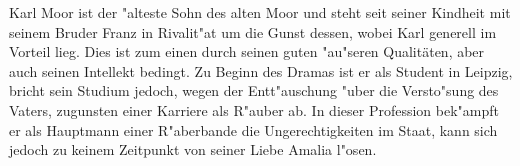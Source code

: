 Karl Moor ist der "alteste Sohn des alten Moor und steht seit seiner Kindheit mit seinem Bruder Franz in Rivalit"at um die Gunst dessen, wobei Karl generell im Vorteil lieg. Dies ist zum einen durch seinen guten "au"seren Qualitäten, aber auch seinen Intellekt bedingt.
Zu Beginn des Dramas ist er als Student in Leipzig, bricht sein Studium jedoch, wegen der Entt"auschung "uber die Versto"sung des Vaters, zugunsten einer Karriere als R"auber ab. In dieser Profession bek"ampft er als Hauptmann einer R"aberbande die Ungerechtigkeiten im Staat, kann sich jedoch zu keinem Zeitpunkt von seiner Liebe Amalia l"osen.
